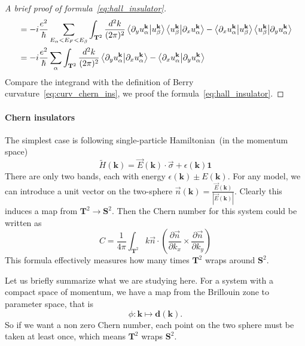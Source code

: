 \documentclass[12pt,a4paper]{article}
\numberwithin{equation}{section}
\newcommand{\pderiv}[2]{\frac{\partial #1}{\partial #2}}  %
\begin{document}
\begin{proof}[A brief proof of formula~\eqref{eq:hall_insulator}]
\begin{equation}
\begin{aligned}
            &= -i\frac{e^2}{\hbar} \sum_{E_\alpha<E_F<E_\beta}\int_{\mathbf{T}^2}\frac{d^2k}{(2\pi)^2} \braket{\partial_y u_{\alpha}^\mathbf{k}}{u_{\beta}^\mathbf{k}}\braket{u_{\beta}^\mathbf{k}}{\partial_x u_{\alpha}^\mathbf{k}}-\braket{\partial_x u_{\alpha}^\mathbf{k}}{u_{\beta}^\mathbf{k}}\braket{u_{\beta}^\mathbf{k}}{\partial_y u_{\alpha}^\mathbf{k}} \\
            &= -i\frac{e^2}{\hbar} \sum_{\alpha}\int_{\mathbf{T}^2}\frac{d^2k}{(2\pi)^2} \braket{\partial_y u_{\alpha}^\mathbf{k}}{\partial_x u_{\alpha}^\mathbf{k}}-\braket{\partial_x u_{\alpha}^\mathbf{k}}{\partial_y u_{\alpha}^\mathbf{k}}
        \end{aligned}
    \end{equation}
    Compare the integrand with the definition of Berry curvature~\eqref{eq:curv_chern_ins}, we proof the formula~\eqref{eq:hall_insulator}.
\end{proof}

\paragraph{Chern insulators} 
The simplest case is following single-particle Hamiltonian~(in the momentum space)
\begin{equation}
    \tilde{H}(\mathbf{k}) = \vec{E}(\mathbf{k})\cdot \vec{\sigma} + \epsilon(\mathbf{k})\mathbf{1}
\end{equation}
There are only two bands, each with energy $\epsilon(\mathbf{k})\pm E(\mathbf{k})$. For any model, we can introduce a unit vector on the two-sphere $\vec{n}(\mathbf{k}) = \frac{\vec{E}(\mathbf{k})}{|\vec{E}(\mathbf{k})|}$. Clearly this induces a map from $\mathbf{T}^2\to\mathbf{S}^2$.
Then the Chern number for this system could be written as
\begin{equation}
    C = \frac{1}{4\pi}\int_{\mathbf{T}^2}k \vec{n}\cdot (\pderiv{\vec n}{k_x}\times\pderiv{\vec n}{k_y})
\end{equation}
This formula effectively measures how many times $\mathbf{T}^2$ wraps around $\mathbf{S}^2$.

\begin{tcolorbox}[
    colback=orange!8,      %
    colframe=orange!70!black, %
    coltitle=white,        %
    colbacktitle=orange!80!black, %
    title={A simple understanding of non-zero Chern number},
    fonttitle=\bfseries,
    boxrule=0.8pt
]
Let us briefly summarize what we are studying here. For a system with a compact space of momentum, we have a map from the Brillouin zone to parameter space, that is
\[
\phi:\mathbf{k}\mapsto \mathbf{d}(\mathbf{k}).
\]
So if we want a non zero Chern number, each point on the two sphere must be taken at least once, which means $\mathbf{T}^2$ wraps $\mathbf{S}^2$.
\end{tcolorbox}
\end{document}
